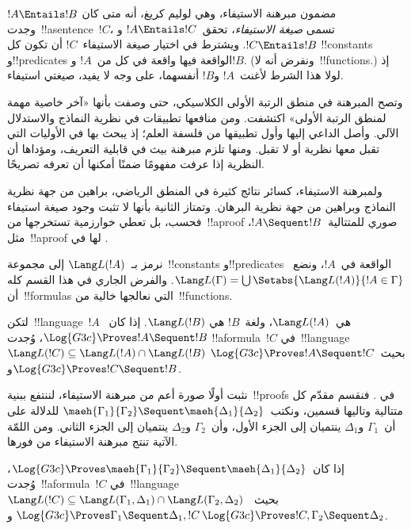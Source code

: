 \documentclass[../../../include/open-logic-section]{subfiles}
\begin{document}


مضمون مبرهنة الاستيفاء، وهي لوليم كريغ، أنه متى كان
$!A \Entails !B$ وجدت~!!a{sentence}~$!C$، تسمى
\emph{صيغة الاستيفاء}، تحقق~$!A \Entails !C$ و$!C \Entails !B$.
ويشترط في اختيار صيغة الاستيفاء~$!C$ أن تكون كل
!!{constant}s و!!{predicate}s الواقعة فيها واقعة في كل من~$!A$ و$!B$.
(ونفرض أنه لا~!!{function}s.) إذ لولا هذا الشرط لأغنت~$!A$
و$!B$ أنفسهما، على وجه لا يفيد، صيغتي استيفاء.

وتصح المبرهنة في منطق الرتبة الأولى الكلاسيكي، حتى وصفت بأنها «آخر خاصية
مهمة لمنطق الرتبة الأولى» اكتشفت. ومن منافعها تطبيقات في نظرية النماذج
والاستدلال الآلي. وأصل الداعي إليها وأول تطبيقها من فلسفة العلم؛ إذ يبحث
بها في الأوليات التي تقبل معها نظرية أو لا تقبل. ومنها تلزم مبرهنة بيث
في قابلية التعريف، ومؤداها أن النظرية إذا عرفت مفهومًا ضمنًا أمكنها أن
تعرفه تصريحًا.

ولمبرهنة الاستيفاء، كسائر نتائج كثيرة في المنطق الرياضي، براهين من جهة
نظرية النماذج وبراهين من جهة نظرية البرهان. وتمتاز الثانية بأنها لا تثبت
وجود صيغة استيفاء فحسب، بل تعطي خوارزمية تستخرجها من~!!a{proof} صوري
للمتتالية~$!A \Sequent !B$، مثل~!!a{proof} لها في
.

نرمز بـ~$\Lang L(!A)$ إلى مجموعة~!!{constant}s و!!{predicate}s الواقعة
في~$!A$، ونضع~$\Lang L(\Gamma) = \bigcup \Setabs{\Lang L(!A)}{!A \in
\Gamma}$. والفرض الجاري في هذا القسم كله أن~!!{formula}s التي نعالجها
خالية من~!!{function}s.

\begin{thm}
لتكن~!!{language}~$!A$ هي~$\Lang L(!A)$، ولغة~$!B$ هي
$\Lang L(!B)$. إذا كان~$\Log{G3c} \Proves !A \Sequent !B$، وُجدت
!!a{formula}~$!C$ في~!!{language}~$\Lang L(!C) \subseteq \Lang
L(!A) \cap \Lang L(!B)$ بحيث~$\Log{G3c} \Proves !A \Sequent !C$
و$\Log{G3c} \Proves !C \Sequent !B$.
\end{thm}

نثبت أولًا صورة أعم من مبرهنة الاستيفاء، لننتفع ببنية~!!{proof}s في
. فنقسم مقدّم كل متتالية وتاليها قسمين، ونكتب~$\maeh{\Gamma_1}{\Gamma_2} \Sequent
\maeh{\Delta_1}{\Delta_2}$ للدلالة على أن~$\Gamma_1$ و$\Delta_1$
ينتميان إلى الجزء الأول، وأن~$\Gamma_2$ و$\Delta_2$ ينتميان إلى الجزء
الثاني. ومن اللمّة الآتية تنتج مبرهنة الاستيفاء من فورها.

\begin{lem}[لمّة ماهارا] إذا كان~$\Log{G3c}
\Proves \maeh{\Gamma_1}{\Gamma_2} \Sequent \maeh{\Delta_1}{\Delta_2}$،
وُجدت~!!a{formula}~$!C$ في~!!{language}~$\Lang L(!C)
\subseteq \Lang L(\Gamma_1,
\Delta_1) \cap \Lang L(\Gamma_2, \Delta_2)$ بحيث~$\Log{G3c}
\Proves \Gamma_1 \Sequent \Delta_1, !C$ و$\Log{G3c} \Proves !C,
\Gamma_2 \Sequent \Delta_2$.
\end{lem}
\end{document}
